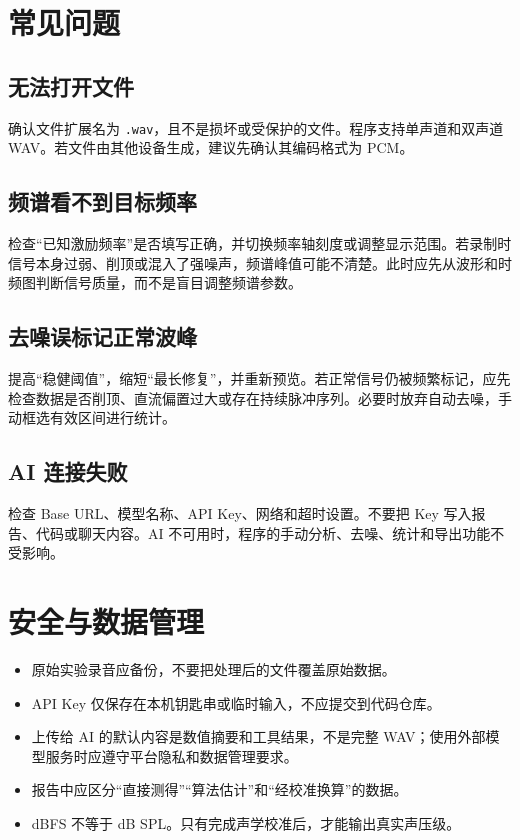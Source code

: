 \documentclass[UTF8,a4paper,12pt,scheme=chinese]{ctexart}
\begin{document}
\section{常见问题}

\subsection{无法打开文件}

确认文件扩展名为 \texttt{.wav}，且不是损坏或受保护的文件。程序支持单声道和双声道 WAV。若文件由其他设备生成，建议先确认其编码格式为 PCM。

\subsection{频谱看不到目标频率}

检查“已知激励频率”是否填写正确，并切换频率轴刻度或调整显示范围。若录制时信号本身过弱、削顶或混入了强噪声，频谱峰值可能不清楚。此时应先从波形和时频图判断信号质量，而不是盲目调整频谱参数。

\subsection{去噪误标记正常波峰}

提高“稳健阈值”，缩短“最长修复”，并重新预览。若正常信号仍被频繁标记，应先检查数据是否削顶、直流偏置过大或存在持续脉冲序列。必要时放弃自动去噪，手动框选有效区间进行统计。

\subsection{AI 连接失败}

检查 Base URL、模型名称、API Key、网络和超时设置。不要把 Key 写入报告、代码或聊天内容。AI 不可用时，程序的手动分析、去噪、统计和导出功能不受影响。

\section{安全与数据管理}

\begin{itemize}
  \item 原始实验录音应备份，不要把处理后的文件覆盖原始数据。
  \item API Key 仅保存在本机钥匙串或临时输入，不应提交到代码仓库。
  \item 上传给 AI 的默认内容是数值摘要和工具结果，不是完整 WAV；使用外部模型服务时应遵守平台隐私和数据管理要求。
  \item 报告中应区分“直接测得”“算法估计”和“经校准换算”的数据。
  \item dBFS 不等于 dB SPL。只有完成声学校准后，才能输出真实声压级。
\end{itemize}
\end{document}
